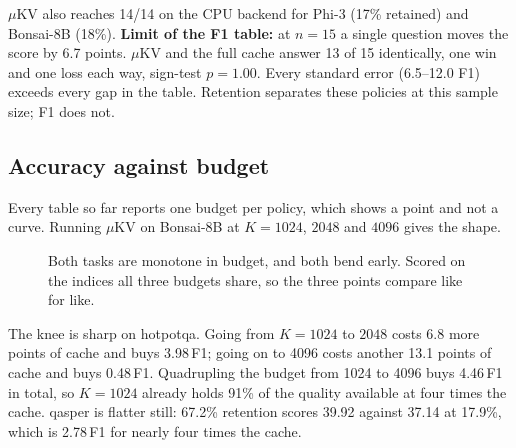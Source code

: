 \documentclass[11pt]{article}
\begin{document}
\noindent $\mu$KV also reaches 14/14 on the CPU backend for Phi-3 (17\% retained) and
Bonsai-8B (18\%). \textbf{Limit of the F1 table:} at $n{=}15$ a single question moves the
score by 6.7 points. $\mu$KV and the full cache answer 13 of 15 identically, one win and one
loss each way, sign-test $p{=}1.00$. Every standard error (6.5--12.0 F1) exceeds every gap in
the table. Retention separates these policies at this sample size; F1 does not.

\subsection{Accuracy against budget}
Every table so far reports one budget per policy, which shows a point and not a curve. Running
$\mu$KV on Bonsai-8B at $K=1024$, $2048$ and $4096$ gives the shape.

\begin{figure}[h]\centering
{}
\caption{Both tasks are monotone in budget, and both bend early. Scored on the indices all
three budgets share, so the three points compare like for like.}
\label{fig:budget}
\end{figure}

\noindent The knee is sharp on hotpotqa. Going from $K{=}1024$ to $2048$ costs 6.8 more points
of cache and buys 3.98\,F1; going on to 4096 costs another 13.1 points of cache and buys
0.48\,F1. Quadrupling the budget from 1024 to 4096 buys 4.46\,F1 in total, so $K{=}1024$
already holds 91\% of the quality available at four times the cache. qasper is flatter still:
67.2\% retention scores 39.92 against 37.14 at 17.9\%, which is 2.78\,F1 for nearly four times
the cache.
\end{document}
